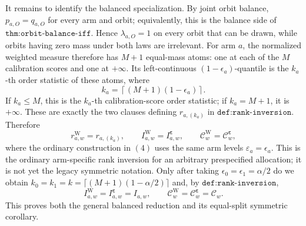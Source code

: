 It remains to identify the balanced specialization. By joint orbit balance, \(p_{a,O}=q_{a,O}\) for every arm and orbit; equivalently, this is the balance side of \(\texttt{thm:orbit-balance-iff}\). Hence \(\lambda_{a,O}=1\) on every orbit that can be drawn, while orbits having zero mass under both laws are irrelevant. For arm \(a\), the normalized weighted measure therefore has \(M+1\) equal-mass atoms: one at each of the \(M\) calibration scores and one at \(+\infty\). Its left-continuous \((1-\epsilon_a)\)-quantile is the \(k_a\)-th order statistic of these atoms, where
\[
k_a=\left\lceil(M+1)(1-\epsilon_a)\right\rceil.
\]
If \(k_a\le M\), this is the \(k_a\)-th calibration-score order statistic; if \(k_a=M+1\), it is \(+\infty\). These are exactly the two clauses defining \(r_{a,(k_a)}\) in \(\texttt{def:rank-inversion}\). Therefore
\[
r^{\mathrm W}_{a,w}=r_{a,(k_a)},\qquad I^{\mathrm W}_{a,w}=I^{\boldsymbol\varepsilon}_{a,w},\qquad \mathcal C^{\mathrm W}_w=\mathcal C^{\boldsymbol\varepsilon}_w,
\tag{4}
\]
where the ordinary construction in \((4)\) uses the same arm levels \(\varepsilon_a=\epsilon_a\). This is the ordinary arm-specific rank inversion for an arbitrary prespecified allocation; it is not yet the legacy symmetric notation. Only after taking \(\epsilon_0=\epsilon_1=\alpha/2\) do we obtain \(k_0=k_1=k=\lceil(M+1)(1-\alpha/2)\rceil\) and, by \(\texttt{def:rank-inversion}\),
\[
I^{\mathrm W}_{a,w}=I^{\boldsymbol\varepsilon}_{a,w}=I_{a,w},\qquad \mathcal C^{\mathrm W}_w=\mathcal C^{\boldsymbol\varepsilon}_w=\mathcal C_w.
\]
This proves both the general balanced reduction and its equal-split symmetric corollary.